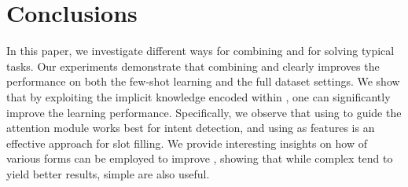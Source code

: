 \section{Conclusions}
In this paper, we investigate different ways for combining \NNs and \REs for solving typical \SLU tasks. Our experiments demonstrate that
combining \NNs and \REs clearly improves the \NN performance on both the few-shot learning and the  full dataset settings. We show that by
exploiting the implicit knowledge encoded within \REs, one can significantly improve the learning performance. Specifically, we observe
that using \REs to guide the attention module works best for intent detection, and using \REtags as features is an effective approach for
slot filling. We provide interesting insights on how \REs of various forms can be employed to improve \NNs, showing that while complex \REs
tend to yield better results, simple \REs are also useful.
